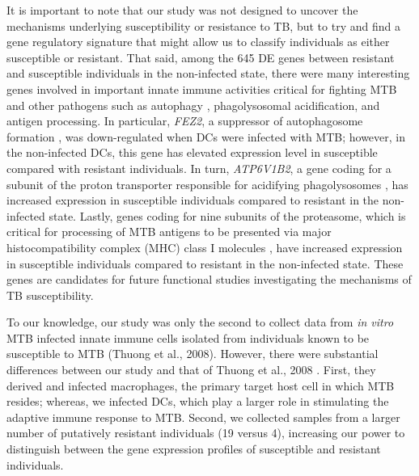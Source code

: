 \documentclass[fleqn,10pt]{wlscirep}
\begin{document}
It is important to note that our study was not designed to uncover the
mechanisms underlying susceptibility or resistance to TB, but to try
and find a gene regulatory signature that might allow us to classify
individuals as either susceptible or resistant. That said, among the
645 DE genes between resistant and susceptible individuals in the
non-infected state, there were many interesting genes involved in
important innate immune activities critical for fighting MTB and other
pathogens such as autophagy \cite{Deretic2014, Castrejon-Jimenez2015},
phagolysosomal acidification, and antigen processing. In particular,
\emph{FEZ2}, a suppressor of autophagosome formation \cite{Spang2014},
was down-regulated when DCs were infected with MTB; however, in the
non-infected DCs, this gene has elevated expression level in
susceptible compared with resistant individuals. In turn,
\emph{ATP6V1B2}, a gene coding for a subunit of the proton transporter
responsible for acidifying phagolysosomes \cite{Sturgill-Koszycki1994,
Hornef2002, Hestvik2005}, has increased expression in susceptible
individuals compared to resistant in the non-infected state. Lastly,
genes coding for nine subunits of the proteasome, which is critical
for processing of MTB antigens to be presented via major
histocompatibility complex (MHC) class I molecules \cite{Flynn1992,
Grotzke2009, Grotzke2010, LindestamArlehamn2014}, have increased
expression in susceptible individuals compared to resistant in the
non-infected state. These genes are candidates for future functional
studies investigating the mechanisms of TB susceptibility.

To our knowledge, our study was only the second to collect data from
\emph{in vitro} MTB infected innate immune cells isolated from
individuals known to be susceptible to MTB (Thuong et al., 2008).
However, there were substantial differences between our study and that
of Thuong et al., 2008 \cite{Thuong2008}. First, they derived and
infected macrophages, the primary target host cell in which MTB
resides; whereas, we infected DCs, which play a larger role in
stimulating the adaptive immune response to MTB. Second, we collected
samples from a larger number of putatively resistant individuals (19
versus 4), increasing our power to distinguish between the gene
expression profiles of susceptible and resistant individuals.
\end{document}
